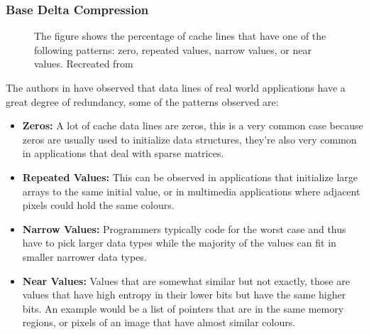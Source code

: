 \subsubsection{Base Delta Compression}
\begin{figure}
    \caption[BDI Patterns]{The figure shows the percentage of cache lines that have one of the following patterns: zero, repeated values, narrow values, or near values. Recreated from \protect\cite{bdi}}
    \label{fig:BDIPotential}
\end{figure}
The authors in \cite{bdi} have observed that data lines of real world applications have a great degree of redundancy, some of the patterns observed are:
\begin{itemize}
    \item \textbf{Zeros:} A lot of cache data lines are zeros, this is a very common case because zeros are usually used to initialize data structures, they're also very common in applications that deal with sparse matrices.
    \item \textbf{Repeated Values:} This can be observed in applications that initialize large arrays to the same initial value, or in multimedia applications where adjacent pixels could hold the same colours.
    \item \textbf{Narrow Values:} Programmers typically code for the worst case and thus have to pick larger data types while the majority of the values can fit in smaller narrower data types.
    \item \textbf{Near Values:} Values that are somewhat similar but not exactly, those are values that have high entropy in their lower bits but have the same higher bits. An example would be a list of pointers that are in the same memory regions, or pixels of an image that have almost similar colours.
\end{itemize}
